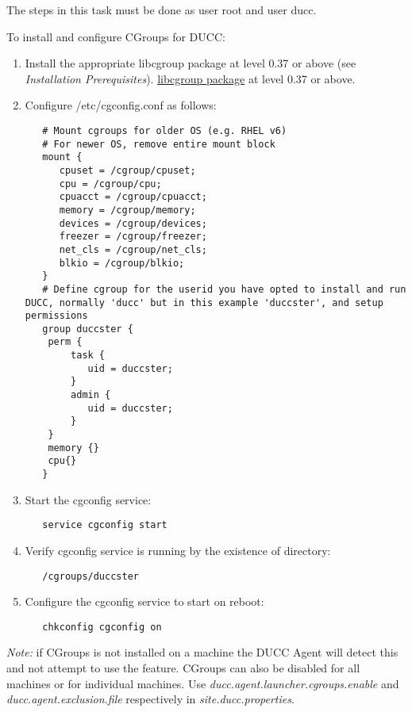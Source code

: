     The steps in this task must be done as user root and user ducc.

    To install and configure CGroups for DUCC:
    \begin{enumerate}
       \item Install the appropriate 
   \ifdefined\DUCCSTANDALONE
   libcgroup package at level 0.37 or above (see {\em Installation Prerequisites}).
   \else
   \hyperref[sec:install.prerequisites]{libcgroup package} at level 0.37 or above.
   \fi

       \item Configure /etc/cgconfig.conf as follows:
\begin{verbatim}
   # Mount cgroups for older OS (e.g. RHEL v6)
   # For newer OS, remove entire mount block 
   mount {
      cpuset = /cgroup/cpuset;
      cpu = /cgroup/cpu;
      cpuacct = /cgroup/cpuacct;
      memory = /cgroup/memory;
      devices = /cgroup/devices;
      freezer = /cgroup/freezer;
      net_cls = /cgroup/net_cls;
      blkio = /cgroup/blkio;
   }
   # Define cgroup for the userid you have opted to install and run DUCC, normally 'ducc' but in this example 'duccster', and setup permissions
   group duccster {
    perm {
        task {
           uid = duccster;
        }
        admin {
           uid = duccster;
        }
    }
    memory {}
    cpu{}
   }
\end{verbatim}
       \item Start the cgconfig service:
\begin{verbatim}
   service cgconfig start
\end{verbatim}
         
       \item Verify cgconfig service is running by the existence of directory: 
\begin{verbatim}
   /cgroups/duccster
\end{verbatim}

       \item Configure the cgconfig service to start on reboot:
\begin{verbatim}
   chkconfig cgconfig on
\end{verbatim}
    \end{enumerate}

{\em Note:} if CGroups is not installed on a machine the DUCC Agent will detect this and not 
  	attempt to use the feature. 
  	CGroups can also be disabled for all machines or for individual machines.
  	Use 
  	{\em ducc.agent.launcher.cgroups.enable} 
  	and 
  	{\em ducc.agent.exclusion.file}
  	respectively in
  	{\em site.ducc.properties}.
  	

